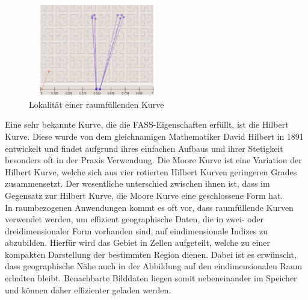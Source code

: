 \documentclass[course=erap]{aspdoc}
\begin{document}
\begin{figure}[h]
\centering
      \includegraphics[width=6cm, height=4cm]{Locality}
    \caption{Lokalität einer raumfüllenden Kurve \cite{pic:locality}}
    \label{fig:locality}
\end{figure}

Eine sehr bekannte Kurve, die die FASS-Eigenschaften erfüllt, ist die Hilbert Kurve. Diese wurde von dem gleichnamigen Mathematiker David Hilbert in 1891 entwickelt und findet aufgrund ihres einfachen Aufbaus und ihrer Stetigkeit besonders oft in der Praxis Verwendung.
\newline
Die Moore Kurve ist eine Variation der Hilbert Kurve, welche sich aus vier rotierten Hilbert Kurven geringeren Grades zusammensetzt. 
Der wesentliche unterschied zwischen ihnen ist, dass im Gegensatz zur Hilbert Kurve, die Moore Kurve eine geschlossene Form hat.
\\
In raumbezogenen Anwendungen kommt es oft vor, dass raumfüllende Kurven verwendet werden, um effizient geographische Daten, die in zwei- oder dreidimensionaler Form vorhanden sind, auf eindimensionale Indizes zu abzubilden. Hierfür wird das Gebiet in Zellen aufgeteilt, welche zu einer kompakten Darstellung der bestimmten Region dienen. Dabei ist es erwünscht, dass geographische Nähe auch in der Abbildung auf den eindimensionalen Raum erhalten bleibt. Benachbarte Bilddaten liegen somit nebeneinander im Speicher und können daher effizienter geladen werden.
\end{document}
